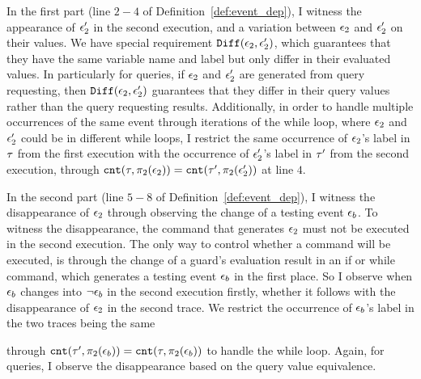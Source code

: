 {%
In the first part (line $2-4$ of Definition~\ref{def:event_dep}), I witness
the appearance of $\mathtt{\epsilon}_2'$ in the second execution, and
a variation between $\mathtt{\epsilon}_2$ and $\mathtt{\epsilon}_2'$ on their values.
We have special requirement $\mathtt{Diff}(\mathtt{\epsilon}_2, \mathtt{\epsilon}_2')$, which guarantees that they
have the same variable name and label but only differ 
in their evaluated values.
In particularly for queries, if $\mathtt{\epsilon}_2$ and $\mathtt{\epsilon}_2'$ are 
generated from query requesting, then $\mathtt{Diff}(\mathtt{\epsilon}_2, \mathtt{\epsilon}_2')$ guarantees that
they differ in their query values rather than the 
query requesting results. 
Additionally, in order to handle multiple occurrences of the same event through iterations of the while loop,
 where  $\mathtt{\epsilon}_2$ and $\mathtt{\epsilon}_2'$ could be 
in different while loops,
I restrict the same occurrence of $\mathtt{\epsilon}_2$'s label in $\mathtt{\tau}$ from the first execution with  the occurrence of $\mathtt{\epsilon}_2'$'s label in $\mathtt{\tau}'$ from the second execution,
through $\mathtt{cnt}(\mathtt{\tau}, \pi_2(\mathtt{\epsilon}_2))
= 
\mathtt{cnt}(\mathtt{\tau}', \pi_2(\mathtt{\epsilon}_2'))$ at line $4$.

In the second part (line $5-8$ of Definition~\ref{def:event_dep}), I 
witness
the disappearance of $\mathtt{\epsilon}_2$ through observing the change of a testing event $\mathtt{\epsilon}_b$.
To witness
the disappearance, the command that generates $\mathtt{\epsilon}_2$ must not be executed in 
the second execution. 
The only way to control whether a command will be executed, is through the change of a guard's 
evaluation result in an if or while command, which generates a testing event $\mathtt{\epsilon}_b$ in the first place.
So I observe when
$\mathtt{\epsilon}_b$ changes into $\neg \mathtt{\epsilon}_b$ in the second execution firstly, 
whether it follows with the disappearance of $\mathtt{\epsilon}_2$ in the second trace. We restrict the occurrence of $\mathtt{\epsilon}_b$'s label in the two traces being the same
}
through $\mathtt{cnt}(\mathtt{\tau}', \pi_2(\mathtt{\epsilon}_b)) = \mathtt{cnt}(\mathtt{\tau}, \pi_2(\mathtt{\epsilon}_b))$ to handle the while loop.
Again, for queries, I observe the disappearance based on the query value equivalence.
%

